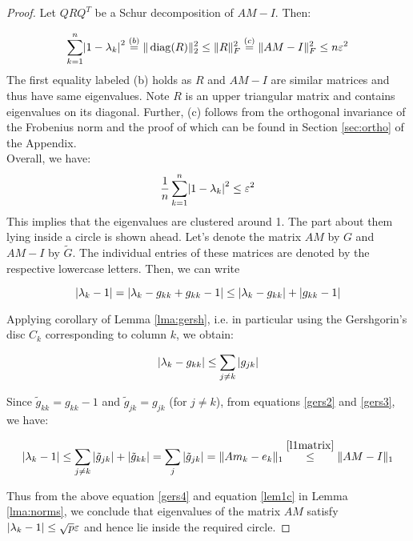 \documentclass[paper=A4, fontsize=11pt]{scrartcl}
\let\originalleft\left
\let\originalright\right
\renewcommand{\left}{\mathopen{}\mathclose\bgroup\originalleft}
\renewcommand{\right}{\aftergroup\egroup\originalright}
\theoremstyle{remark}
\newcommand{\dk}{g_{kk}} %
\newcommand{\dktil}{\tilde{g}_{kk}} %
\begin{document}
\begin{proof}
	
Let $Q R Q^{T}$ be a Schur decomposition of $A M-I$. Then:

\begin{equation}
\sum_{k=1}^{n}\left|1-\lambda_{k}\right|^{2} \overset{(b)}{=} \|\operatorname{diag}(R)\|_{2}^{2} \leq\|R\|_{F}^{2} \overset{(c)}{=} \|A M-I\|_{F}^{2} \leq n \varepsilon^{2}
\end{equation}
The first equality labeled (b) holds as $R$ and $ A M -I$ are similar matrices and thus have same eigenvalues. Note $R$ is an upper triangular matrix and contains eigenvalues on its diagonal.
Further, (c) follows from the orthogonal invariance of the Frobenius norm and the proof of which can be found in Section \ref{sec:ortho} of the Appendix. \\

Overall, we have:
\begin{equation}
\frac{1}{n} \sum_{k=1}^{n}\left|1-\lambda_{k}\right|^{2} \leq \varepsilon^{2}
\end{equation}
This implies that the eigenvalues are clustered around 1. The part about them lying inside a circle is shown ahead. Let's denote the matrix $A M$ by $G$ and $A M - I$ by $\tilde{G}$. The individual entries of these matrices are denoted by the respective lowercase letters. Then, we can write

\begin{equation}\label{gers2}
\left|\lambda_{k} - 1 \right| = \left|\lambda_{k} - \dk  + \dk - 1 \right| \leq \left|\lambda_{k} - \dk \right|  + \left|\dk - 1 \right| %
\end{equation}

Applying corollary of Lemma \ref{lma:gersh}, i.e. in particular using the Gershgorin's disc $C_k$ corresponding to column $k$, we obtain:

\begin{equation}\label{gers3}
\left|\lambda_{k} - \dk \right| \leq \sum_{j \neq k}\, \left|g_{j k}\right|
\end{equation}

Since $ \dktil = \dk - 1 $ and $\tilde{g}_{j k} = g_{j k}$ (for $j\neq k$), from equations \eqref{gers2} and \eqref{gers3}, we have:  

\begin{equation}\label{gers4}
\left|\lambda_{k} - 1 \right| \leq \sum_{j \neq k}\, \left|\tilde{g}_{j k}\right| + \left|\dktil\right| = \sum_{j }\, \left|\tilde{g}_{j k}\right| = \|A m_k -e_k\|_{1} \overset{\eqref{l1matrix}}{\leq} \|A M-I\|_{1}
\end{equation}

Thus from the above equation \eqref{gers4} and equation \eqref{lem1c} in Lemma \ref{lma:norms}, we conclude that eigenvalues of the matrix $A M$ satisfy $ \left|\lambda_{k} - 1 \right| \leq \sqrt{p} \varepsilon$ and hence lie inside the required circle.
\end{proof}
\end{document}
